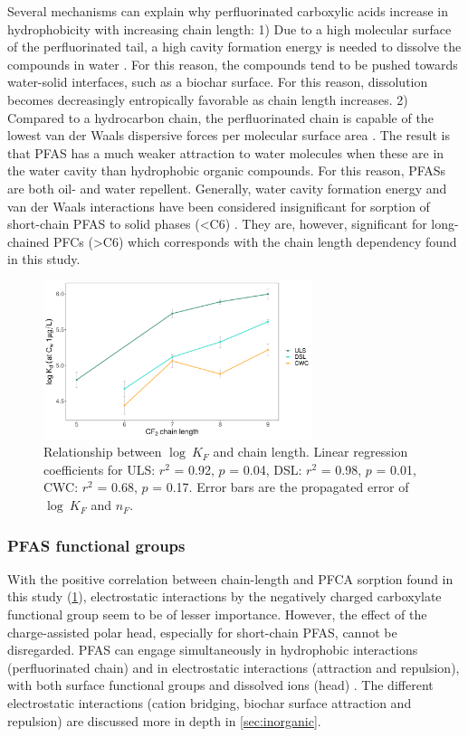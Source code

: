 Several mechanisms can explain why perfluorinated carboxylic acids increase in hydrophobicity with increasing chain length: 1) Due to a high molecular surface of the perfluorinated tail, a high cavity formation energy is needed to dissolve the compounds in water \citep{Arp2006}. For this reason, the compounds tend to be pushed towards water-solid interfaces, such as a biochar surface. For this reason, dissolution becomes decreasingly entropically favorable as chain length increases\citep{sigmund2022sorption}. 2) Compared to a hydrocarbon chain, the perfluorinated chain is capable of the lowest van der Waals dispersive forces per molecular surface area \citep{du2014adsorption}. The result is that PFAS has a much weaker attraction to water molecules when these are in the water cavity than hydrophobic organic compounds. For this reason, PFASs are both oil- and water repellent.  Generally, water cavity formation energy and van der Waals interactions have been considered insignificant for sorption of short-chain PFAS to solid phases (\textless C6) \citep{du2014adsorption}. They are, however, significant for long-chained PFCs (\textgreater C6) \citep{du2014adsorption} which corresponds with the chain length dependency found in this study.

\begin{figure}[tbh]
    \centering
    \includegraphics[width=0.7\textwidth]{R/figs/chain_length_Kd1ugL_plot.pdf}
    \caption{Relationship between $\log~K_F$ and chain length. Linear regression coefficients for ULS: $r^2$ = 0.92, $p$ = 0.04, DSL: $r^2$ = 0.98, $p$ = 0.01, CWC: $r^2$ = 0.68, $p$ = 0.17. Error bars are the propagated error of $\log~K_F$ and $n_F$.}
    \label{fig:chainlength}
\end{figure}

\subsubsection{PFAS functional groups} 
With the positive correlation between chain-length and PFCA sorption found in this study (\cref{fig:chainlength}), electrostatic interactions by the negatively charged carboxylate functional group seem to be of lesser importance. However, the effect of the charge-assisted polar head, especially for short-chain PFAS, cannot be disregarded. PFAS can engage simultaneously in hydrophobic interactions (perfluorinated chain) and in electrostatic interactions (attraction and repulsion), with both surface functional groups and dissolved ions (head) \citep{zhang2013sorption,sigmund2022sorption}. The different electrostatic interactions (cation bridging, biochar surface attraction and repulsion) are discussed more in depth in \cref{sec:inorganic}.

